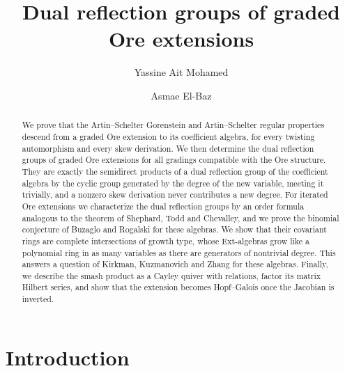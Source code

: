 \documentclass[reqno]{amsart}
\title{Dual reflection groups of graded Ore extensions}
\author{Yassine Ait Mohamed}
\author{Asmae El-Baz}
\numberwithin{equation}{section}
\theoremstyle{definition}
\theoremstyle{remark}
\theoremstyle{plain}
\begin{document}
\begin{abstract}
We prove that the Artin--Schelter Gorenstein and Artin--Schelter regular properties descend from a graded Ore extension to its coefficient algebra, for every twisting automorphism and every skew derivation. We then determine the dual reflection groups of graded Ore extensions for all gradings compatible with the Ore structure. They are exactly the semidirect products of a dual reflection group of the coefficient algebra by the cyclic group generated by the degree of the new variable, meeting it trivially, and a nonzero skew derivation never contributes a new degree. For iterated Ore extensions we characterize the dual reflection groups by an order formula analogous to the theorem of Shephard, Todd and Chevalley, and we prove the binomial conjecture of Buzaglo and Rogalski for these algebras. We show that their covariant rings are complete intersections of growth type, whose Ext-algebras grow like a polynomial ring in as many variables as there are generators of nontrivial degree. This answers a question of Kirkman, Kuzmanovich and Zhang for these algebras. Finally, we describe the smash product as a Cayley quiver with relations, factor its matrix Hilbert series, and show that the extension becomes Hopf--Galois once the Jacobian is inverted.
\end{abstract}

\maketitle




\section{Introduction}\label{YAMs0Ik2}
\end{document}
